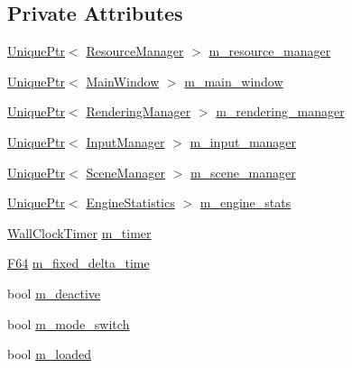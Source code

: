 \subsection*{Private Attributes}
\begin{DoxyCompactItemize}
\item 
\hyperlink{namespacemage_a3316d7143a973e37adf1110f2e80ca31}{Unique\+Ptr}$<$ \hyperlink{classmage_1_1_resource_manager}{Resource\+Manager} $>$ \hyperlink{classmage_1_1_engine_ac8d94579e72983a99a78be6b9b606a28}{m\+\_\+resource\+\_\+manager}
\item 
\hyperlink{namespacemage_a3316d7143a973e37adf1110f2e80ca31}{Unique\+Ptr}$<$ \hyperlink{classmage_1_1_main_window}{Main\+Window} $>$ \hyperlink{classmage_1_1_engine_a3aea7e8c0c1247cac570334a3d3543d6}{m\+\_\+main\+\_\+window}
\item 
\hyperlink{namespacemage_a3316d7143a973e37adf1110f2e80ca31}{Unique\+Ptr}$<$ \hyperlink{classmage_1_1_rendering_manager}{Rendering\+Manager} $>$ \hyperlink{classmage_1_1_engine_a81c7475c3501f84f9bd9c7bbeaebfcb6}{m\+\_\+rendering\+\_\+manager}
\item 
\hyperlink{namespacemage_a3316d7143a973e37adf1110f2e80ca31}{Unique\+Ptr}$<$ \hyperlink{classmage_1_1_input_manager}{Input\+Manager} $>$ \hyperlink{classmage_1_1_engine_a8e9048208a6a5c5b034aaa1cbdab28bc}{m\+\_\+input\+\_\+manager}
\item 
\hyperlink{namespacemage_a3316d7143a973e37adf1110f2e80ca31}{Unique\+Ptr}$<$ \hyperlink{classmage_1_1_scene_manager}{Scene\+Manager} $>$ \hyperlink{classmage_1_1_engine_afac8085ae572d623e77b1e0847440ab4}{m\+\_\+scene\+\_\+manager}
\item 
\hyperlink{namespacemage_a3316d7143a973e37adf1110f2e80ca31}{Unique\+Ptr}$<$ \hyperlink{classmage_1_1_engine_statistics}{Engine\+Statistics} $>$ \hyperlink{classmage_1_1_engine_aa0c82f248a2fbec3fbf778665a440edc}{m\+\_\+engine\+\_\+stats}
\item 
\hyperlink{namespacemage_a06f4035ef59f07892e594bf1178a108a}{Wall\+Clock\+Timer} \hyperlink{classmage_1_1_engine_a539cff5bf8252ef28b994be49e9e6b7c}{m\+\_\+timer}
\item 
\hyperlink{namespacemage_ad26233bbec640deda836e572c1a23708}{F64} \hyperlink{classmage_1_1_engine_a95557e1b6cba52b393c94d80d80bea4c}{m\+\_\+fixed\+\_\+delta\+\_\+time}
\item 
bool \hyperlink{classmage_1_1_engine_ab8a4b0157403708ae7d1d018a95b4c63}{m\+\_\+deactive}
\item 
bool \hyperlink{classmage_1_1_engine_aa5cb2e0b7bb2c4a9020e79ab832ee221}{m\+\_\+mode\+\_\+switch}
\item 
bool \hyperlink{classmage_1_1_engine_a2f8783761b9629dd507d0a6bc456125b}{m\+\_\+loaded}
\end{DoxyCompactItemize}
